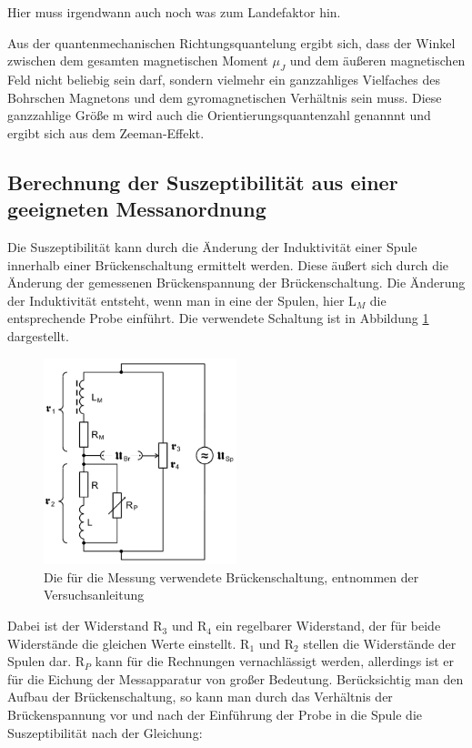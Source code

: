 Hier muss irgendwann auch noch was zum Landefaktor hin.

Aus der quantenmechanischen Richtungsquantelung ergibt sich, dass der Winkel zwischen dem gesamten magnetischen Moment $\mu_J$ und dem äußeren magnetischen Feld nicht beliebig sein darf, sondern vielmehr ein ganzzahliges Vielfaches des Bohrschen Magnetons und dem gyromagnetischen Verhältnis sein muss.
Diese ganzzahlige Größe m wird auch die Orientierungsquantenzahl genannnt und ergibt sich aus dem Zeeman-Effekt.

\subsection{Berechnung der Suszeptibilität aus einer geeigneten Messanordnung}
\label{sec:praktischeTheorie}

Die Suszeptibilität kann durch die Änderung der Induktivität einer Spule innerhalb einer Brückenschaltung ermittelt werden.
Diese äußert sich durch die Änderung der gemessenen Brückenspannung der Brückenschaltung.
Die Änderung der Induktivität entsteht, wenn man in eine der Spulen, hier L$_M$ die entsprechende Probe einführt.
Die verwendete Schaltung ist in Abbildung \ref{fig:Brückenschaltung} dargestellt.

\begin{figure}
  \centering
  \includegraphics[width=0.5\textwidth]{images/Brueckenschaltung.png}
  \caption{Die für die Messung verwendete Brückenschaltung, entnommen der Versuchsanleitung\cite[179]{sample}}
  \label{fig:Brückenschaltung}
\end{figure}

Dabei ist der Widerstand R$_3$ und R$_4$ ein regelbarer Widerstand, der für beide Widerstände die gleichen Werte einstellt.
R$_1$ und R$_2$ stellen die Widerstände der Spulen dar.
R$_P$ kann für die Rechnungen vernachlässigt werden, allerdings ist er für die Eichung der Messapparatur von großer Bedeutung.
Berücksichtig man den Aufbau der Brückenschaltung, so kann man durch das Verhältnis der Brückenspannung vor und nach der Einführung der Probe in die Spule die Suszeptibilität nach der Gleichung:

